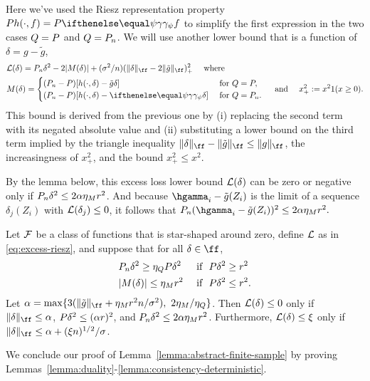 Here we've used the Riesz representation property $\P h(\cdot, f) = \P \riesz[\psi] f$ to simplify the first expression
in the two cases $Q=\P$ and $Q = \Pn$. We will use another lower bound that is a function of $\delta = g-\tilde g$,
\begin{equation}
\label{eq:excess-riesz}
\begin{aligned}
&\excess(\delta) 
= \Pn \delta^2 - 2 \abs{M(\delta)} + (\sigma^2/n) (\norm{\delta}_{\ff} - 2\norm{\gapprox}_{\ff})_+^2 \quad \text{ where }\\
&M(\delta) = \begin{cases} 
(\Pn-\P) [h(\cdot,\delta) - \tilde g \delta] & \text{ for } Q = \P, \\
(\Pn-\P) [h(\cdot,\delta) - \riesz[\psi] \delta] & \text{ for } Q = \Pn.
\end{cases} \quad \text{ and }\quad x_+^2 := x^2 1(x \ge 0).
\end{aligned}
\end{equation} 
This bound is derived from the previous one by (i) replacing the second term with its negated absolute value
and (ii) substituting a lower bound on the third term implied by the triangle inequality 
$\norm{\delta}_{\ff} -  \norm{\tilde g}_{\ff} \le \norm{g}_{\ff}$, the increasingness of $x_+^2$,
and the bound $x_+^2 \le x^2$.

By the lemma below, this excess loss lower bound $\mathcal{L}(\delta)$ can be zero or negative only if 
$\Pn \delta^2 \le 2\alpha \eta_M r^2$. And because $\hgamma_i - \gapprox(Z_i)$ is the limit of a sequence $\delta_j(Z_i)$ 
with $\mathcal{L}(\delta_j) \le 0$, it follows that $\Pn (\hgamma_i - \gapprox(Z_i))^2 \le 2\alpha\eta_M r^2.$

\begin{lemm}
\label{lemma:consistency-deterministic}
Let $\mathcal{F}$ be a class of functions that is star-shaped around zero,
define $\mathcal{L}$ as in \eqref{eq:excess-riesz},
and suppose that for all $\delta \in \ff$,
\begin{equation}
\label{eq:ratio-bounds}
\begin{aligned}
& \Pn  \delta^2 \ge \eta_Q \P \delta^2
&& \text{ if }\ \P \delta^2 \ge r^2 \\
&\abs{M(\delta)} \le \eta_M r^2
&& \text{ if }\ \P \delta^2 \le r^2. 
\end{aligned}
\end{equation}
Let $\alpha = \max\set{3(\norm{\gapprox}_{\ff} + \eta_M r^2 n/\sigma^2),\ 2\eta_M/\eta_Q}$. 
Then $\mathcal{L}(\delta) \le 0$ only if $\norm{\delta}_{\ff} \le \alpha$, 
$\P \delta^2 \le (\alpha r)^2$, and $\Pn \delta^2 \le 2\alpha \eta_M r^2$.
Furthermore, $\mathcal{L}(\delta) \le \xi$ only if $\norm{\delta}_{\ff} \le \alpha + (\xi n)^{1/2}/\sigma$.
\end{lemm}
\noindent We conclude our proof of Lemma~\ref{lemma:abstract-finite-sample}
by proving Lemmas~\ref{lemma:duality}-\ref{lemma:consistency-deterministic}.
 


